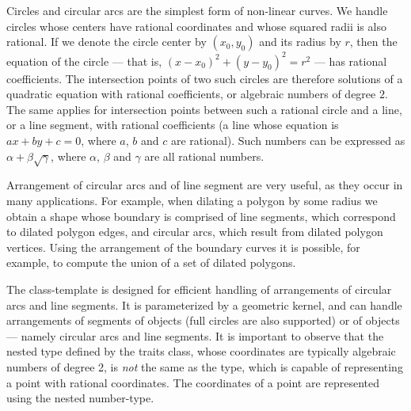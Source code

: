 Circles and circular arcs are the simplest form of non-linear curves.
We handle circles whose centers have rational coordinates and whose
squared radii is also rational. If we denote the circle center by $(x_0,y_0)$
and its radius by $r$, then the equation of the circle --- that is,
$(x - x_0)^2 + (y - y_0)^2 = r^2$ --- has rational coefficients.
The intersection points of two such circles are therefore solutions
of a quadratic equation with rational coefficients, or algebraic numbers
of degree $2$. The same applies for intersection points between such a
rational circle and a line, or a line segment, with rational coefficients
(a line whose equation is $ax + by + c = 0$, where $a$, $b$ and $c$ are
rational). Such numbers can be expressed as $\alpha + \beta\sqrt{\gamma}$,
where $\alpha$, $\beta$ and $\gamma$ are all rational numbers.

Arrangement of circular arcs and of line segment are very useful, as they
occur in many applications. For example, when dilating a polygon by some
radius we obtain a shape whose boundary is comprised of line segments,
which correspond to dilated polygon edges, and circular arcs, which
result from dilated polygon vertices. Using the arrangement of the
boundary curves it is possible, for example, to compute the union of a set
of dilated polygons.

The  class-template is designed
for efficient handling of arrangements of circular arcs and line segments.
It is parameterized by a geometric kernel, and can handle arrangements of
segments of  objects (full circles are also supported)
or of  objects --- namely circular arcs and line segments.
It is important to observe that the nested  type defined by the
traits class, whose coordinates are typically algebraic numbers of degree 2,
is {\em not} the same as the  type, which is capable of
representing a point with rational coordinates. The coordinates of a
point are represented using the nested  number-type.

